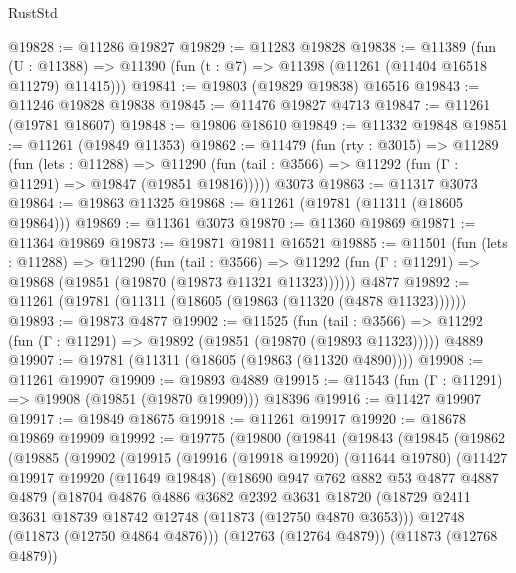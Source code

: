 \begin{lexlean}{RustStd}
\begin{coremodule}
@19828 := @11286 @19827
@19829 := @11283 @19828
@19838 := @11389
    (fun (U : @11388) => @11390 (fun (t : @7) => @11398 (@11261 (@11404 @16518 @11279) @11415)))
@19841 := @19803 (@19829 @19838) @16516
@19843 := @11246 @19828 @19838
@19845 := @11476 @19827 @4713
@19847 := @11261 (@19781 @18607)
@19848 := @19806 @18610
@19849 := @11332 @19848
@19851 := @11261 (@19849 @11353)
@19862 := @11479
    (fun (rty : @3015) =>
    @11289
      (fun (lets : @11288) =>
      @11290 (fun (tail : @3566) => @11292 (fun (Γ : @11291) => @19847 (@19851 @19816)))))
    @3073
@19863 := @11317 @3073
@19864 := @19863 @11325
@19868 := @11261 (@19781 (@11311 (@18605 @19864)))
@19869 := @11361 @3073
@19870 := @11360 @19869
@19871 := @11364 @19869
@19873 := @19871 @19811 @16521
@19885 := @11501
    (fun (lets : @11288) =>
    @11290
      (fun (tail : @3566) =>
      @11292 (fun (Γ : @11291) => @19868 (@19851 (@19870 (@19873 @11321 @11323))))))
    @4877
@19892 := @11261 (@19781 (@11311 (@18605 (@19863 (@11320 (@4878 @11323))))))
@19893 := @19873 @4877
@19902 := @11525
    (fun (tail : @3566) => @11292 (fun (Γ : @11291) => @19892 (@19851 (@19870 (@19893 @11323)))))
    @4889
@19907 := @19781 (@11311 (@18605 (@19863 (@11320 @4890))))
@19908 := @11261 @19907
@19909 := @19893 @4889
@19915 := @11543 (fun (Γ : @11291) => @19908 (@19851 (@19870 @19909))) @18396
@19916 := @11427 @19907
@19917 := @19849 @18675
@19918 := @11261 @19917
@19920 := @18678 @19869 @19909
@19992 := @19775
    (@19800
      (@19841
        (@19843
          (@19845
            (@19862
              (@19885
                (@19902
                  (@19915
                    (@19916
                      (@19918 @19920)
                      (@11644 @19780)
                      (@11427
                        @19917
                        @19920
                        (@11649 @19848)
                        (@18690
                          @947
                          @762
                          @882
                          @53
                          @4877
                          @4887
                          @4879
                          (@18704
                            @4876
                            @4886
                            @3682
                            @2392
                            @3631
                            @18720
                            (@18729 @2411 @3631 @18739 @18742 @12748 (@11873 (@12750 @4870 @3653)))
                            @12748
                            (@11873 (@12750 @4864 @4876)))
                          (@12763 (@12764 @4879))
                          (@11873 (@12768 @4879))

\end{coremodule}
\end{lexlean}
